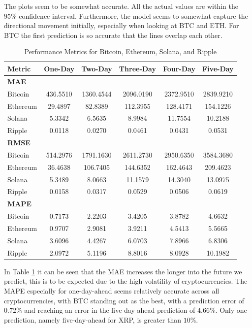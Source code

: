 \noindent The plots seem to be somewhat accurate. All the actual values are within the $95\%$ confidence interval. Furthermore, the model seems to somewhat capture the directional movement initially, especially when looking at BTC and ETH. For BTC the first prediction is so accurate that the lines overlap each other.
\begin{table}[H]
\centering
\begin{tabular}{lccccc}
\toprule
\textbf{Metric} & \textbf{One-Day} & \textbf{Two-Day} & \textbf{Three-Day} & \textbf{Four-Day} & \textbf{Five-Day} \\
\midrule
\textbf{MAE} & & & & & \\
Bitcoin   & 436.5510 & 1360.4544 & 2096.0190 & 2372.9510 & 2839.9210 \\
Ethereum  &  29.4897 &   82.8389 &  112.3955 &  128.4171 &  154.1226 \\
Solana    &   5.3342 &    6.5635 &    8.9984 &   11.7554 &   10.2188 \\
Ripple    &   0.0118 &    0.0270 &    0.0461 &    0.0431 &    0.0531 \\
\midrule
\textbf{RMSE} & & & & & \\
Bitcoin   & 514.2976 & 1791.1630 & 2611.2730 & 2950.6350 & 3584.3680 \\
Ethereum  &  36.4638 &  106.7405 &  144.6352 &  162.4643 &  209.4623 \\
Solana    &   5.3489 &    8.0663 &   11.1579 &   14.3040 &   13.0975 \\
Ripple    &   0.0158 &    0.0317 &    0.0529 &    0.0506 &    0.0619 \\
\midrule
\textbf{MAPE} & & & & & \\
Bitcoin   &   0.7173 &    2.2203 &    3.4205 &    3.8782 &    4.6632 \\
Ethereum  &   0.9707 &    2.9081 &    3.9211 &    4.5413 &    5.5665 \\
Solana    &   3.6096 &    4.4267 &    6.0703 &    7.8966 &    6.8306 \\
Ripple    &   2.0972 &    5.1196 &    8.8016 &    8.0928 &   10.1982 \\
\bottomrule
\end{tabular}
\caption{Performance Metrics for Bitcoin, Ethereum, Solana, and Ripple}
\label{fig:johansen_RMSE_MAE_MAPE}
\end{table}
\noindent In Table \ref{fig:johansen_RMSE_MAE_MAPE} it can be seen that the MAE increases the longer into the future we predict, this is to be expected due to the high volatility of cryptocurrencies. The MAPE especially for one-day-ahead seems relatively accurate across all cryptocurrencies, with BTC standing out as the best, with a prediction error of $0.72\%$ and reaching an error in the five-day-ahead prediction of $4.66\%$. Only one prediction, namely five-day-ahead for XRP, is greater than $10\%$.


